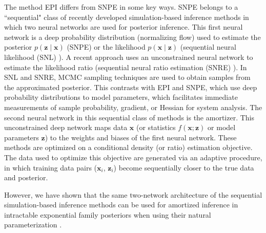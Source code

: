 \documentclass[11pt]{article}
\begin{document}
The method EPI differs from SNPE in some key ways.
SNPE belongs to a ``sequential" class of recently developed simulation-based inference methods in which two neural networks are used for posterior inference.
This first neural network is a deep probability distribution (normalizing flow) used to estimate the posterior $p(\mathbf{z} \mid \mathbf{x})$ (SNPE) or the likelihood  $p(\mathbf{x} \mid \mathbf{z})$ (sequential neural likelihood (SNL) \cite{papamakarios2019sequential}).
A recent approach uses an unconstrained neural network to estimate the likelihood ratio (sequential neural ratio estimation (SNRE) \cite{hermans2020likelihood}).
In SNL and SNRE, MCMC sampling techniques are used to obtain samples from the approximated posterior.
This contrasts with EPI and SNPE, which use deep probability distributions to model parameters, which facilitates immediate measurements of sample probability, gradient, or Hessian for system analysis.
The second neural network in this sequential class of methods is the amortizer.  This unconstrained deep network maps data $\mathbf{x}$ (or statistics $f(\mathbf{x}; \mathbf{z})$ or model parameters $\mathbf{z}$) to the weights and biases of the first neural network.
These methods are optimized on a conditional density (or ratio) estimation objective.
The data used to optimize this objective are generated via an adaptive procedure, in which training data pairs ($\mathbf{x}_i$, $\mathbf{z}_i$) become sequentially closer to the true data and posterior.

However, we have shown that the same two-network architecture of the sequential simulation-based inference methods can be used for amortized inference in intractable exponential family posteriors when using their natural parameterization \cite{bittner2019approximating}.
\end{document}

